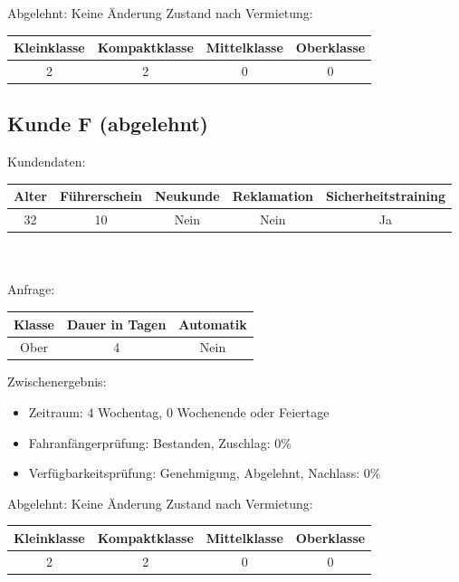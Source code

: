 Abgelehnt: Keine Änderung
Zustand nach Vermietung:\\
\begin{tabular}{|c|c|c|c|}
	\hline \textbf{Kleinklasse} & \textbf{Kompaktklasse} & \textbf{Mittelklasse} & \textbf{Oberklasse}  \\ 
	\hline 2 & 2 & 0 & 0 \\ 
	\hline 
\end{tabular}

\subsection{Kunde F (abgelehnt)}

Kundendaten:\\
\begin{tabular}{|c|c|c|c|c|}
	\hline \textbf{Alter} & \textbf{Führerschein} & \textbf{Neukunde} & \textbf{Reklamation} & \textbf{Sicherheitstraining} \\ 
	\hline 32 & 10 & Nein & Nein & Ja \\ 
	\hline 
\end{tabular} 
\\\\
Anfrage:\\
\begin{tabular}{|c|c|c|}
	\hline \textbf{Klasse} & \textbf{Dauer in Tagen} & \textbf{Automatik} \\ 
	\hline Ober & 4 & Nein \\ 
	\hline 
\end{tabular}

Zwischenergebnis:
\begin{itemize}
	\item Zeitraum: 4 Wochentag, 0 Wochenende oder Feiertage
	\item Fahranfängerprüfung: Bestanden, Zuschlag: 0\%
	\item Verfügbarkeitsprüfung: Genehmigung, Abgelehnt, Nachlass: 0\%
	
\end{itemize}

Abgelehnt: Keine Änderung
Zustand nach Vermietung:\\
\begin{tabular}{|c|c|c|c|}
	\hline \textbf{Kleinklasse} & \textbf{Kompaktklasse} & \textbf{Mittelklasse} & \textbf{Oberklasse}  \\ 
	\hline 2 & 2 & 0 & 0 \\ 
	\hline 
\end{tabular}

